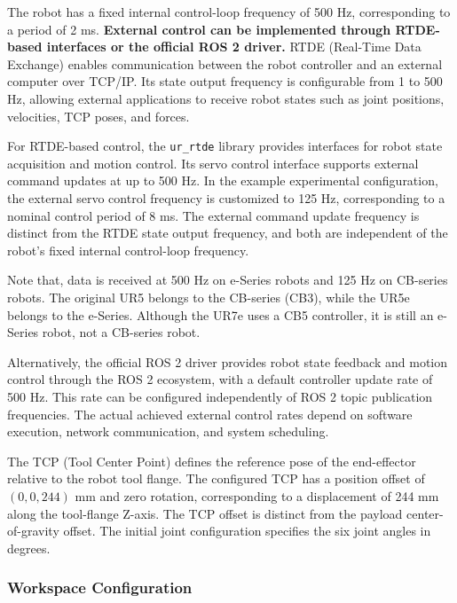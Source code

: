 \documentclass[11pt,a4paper]{article}
\begin{document}
The robot has a fixed internal control-loop frequency of 500 Hz, corresponding to a period of 2 ms. 
\textbf{External control can be implemented through RTDE-based interfaces or the official ROS 2 driver.} 
RTDE (Real-Time Data Exchange) enables communication between the robot controller and an external computer over TCP/IP. Its state output frequency is configurable from 1 to 500 Hz, allowing external applications to receive robot states such as joint positions, velocities, TCP poses, and forces.

For RTDE-based control, the \texttt{ur\_rtde} library provides interfaces for robot state acquisition and motion control. Its servo control interface supports external command updates at up to 500 Hz. In the example experimental configuration, the external servo control frequency is customized to 125 Hz, corresponding to a nominal control period of 8 ms. The external command update frequency is distinct from the RTDE state output frequency, and both are independent of the robot's fixed internal control-loop frequency.

Note that, data is received at 500 Hz on e-Series robots and 125 Hz on CB-series robots. The original UR5 belongs to the CB-series (CB3), while the UR5e belongs to the e-Series. Although the UR7e uses a CB5 controller, it is still an e-Series robot, not a CB-series robot.

Alternatively, the official ROS 2 driver provides robot state feedback and motion control through the ROS 2 ecosystem, with a default controller update rate of 500 Hz. This rate can be configured independently of ROS 2 topic publication frequencies. The actual achieved external control rates depend on software execution, network communication, and system scheduling.

The TCP (Tool Center Point) defines the reference pose of the end-effector relative to the robot tool flange. The configured TCP has a position offset of $(0, 0, 244)$ mm and zero rotation, corresponding to a displacement of 244 mm along the tool-flange Z-axis. The TCP offset is distinct from the payload center-of-gravity offset. The initial joint configuration specifies the six joint angles in degrees.






\subsubsection{Workspace Configuration}
\end{document}
